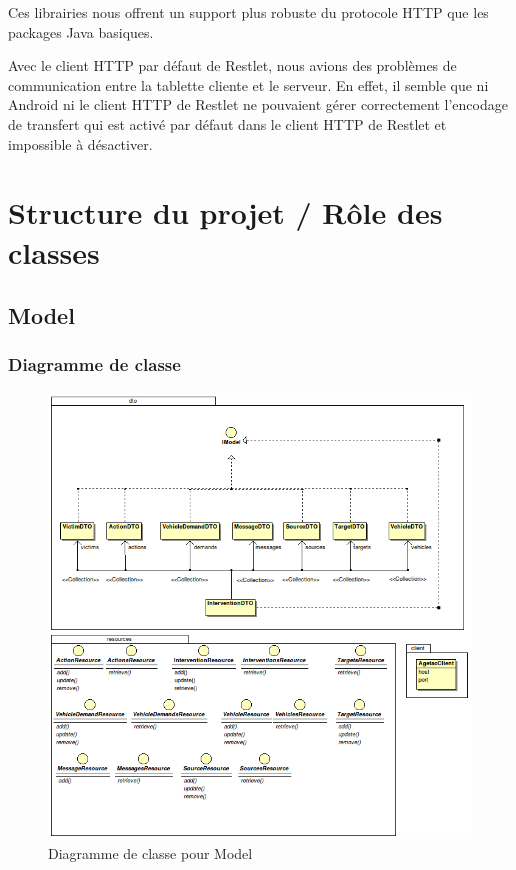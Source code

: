 \documentclass{article}
\begin{document}
Ces librairies nous offrent un support plus robuste du protocole HTTP que les packages Java basiques.

Avec le client HTTP par défaut de Restlet, nous avions des problèmes de communication entre la tablette cliente et le serveur. En effet, il semble que ni Android ni le client HTTP de Restlet ne pouvaient gérer correctement l’encodage de transfert qui est activé par défaut dans le client HTTP de Restlet et impossible à désactiver.

\section{Structure du projet / Rôle des classes}

\subsection{Model}

\subsubsection{Diagramme de classe}

\begin{figure}[htbp]
\begin{center}
\includegraphics[width=400pt]{doc_dev-fig001.png}
\caption{Diagramme de classe pour Model}
\label{1}
\end{center}
\end{figure}
\end{document}
